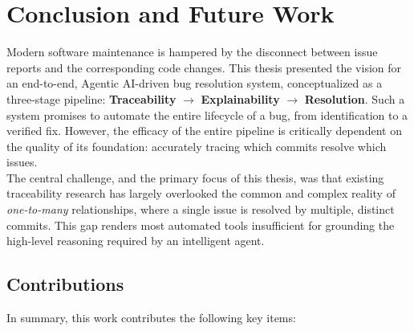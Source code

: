 \section{Conclusion and Future Work}

Modern software maintenance is hampered by the disconnect between issue reports and the corresponding code changes. This thesis presented the vision for an end-to-end, Agentic AI-driven bug resolution system, conceptualized as a three-stage pipeline: \textbf{Traceability} $\rightarrow$ \textbf{Explainability} $\rightarrow$ \textbf{Resolution}. Such a system promises to automate the entire lifecycle of a bug, from identification to a verified fix. However, the efficacy of the entire pipeline is critically dependent on the quality of its foundation: accurately tracing which commits resolve which issues.\\

\noindent
The central challenge, and the primary focus of this thesis, was that existing traceability research has largely overlooked the common and complex reality of \textit{one-to-many} relationships, where a single issue is resolved by multiple, distinct commits. This gap renders most automated tools insufficient for grounding the high-level reasoning required by an intelligent agent.

\subsection*{Contributions}
In summary, this work contributes the following key items:

